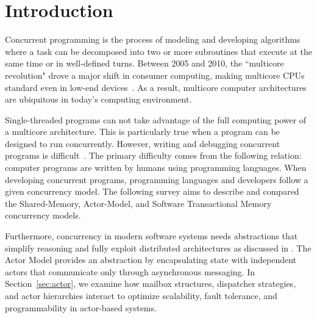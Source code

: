 \section{Introduction\label{sec:introduction}}
Concurrent programming is the process of modeling and
developing algorithms where a task can be decomposed into
two or more subroutines that execute at the same time or in well-defined turns.
Between 2005 and 2010, the ``multicore revolution" drove a major shift in consumer computing,
making multicore CPUs standard even in low-end devices~\cite{alseqyani2023history}.
As a result, multicore computer architectures are ubiquitous in today’s computing environment.

Single-threaded programs can not take advantage of the full computing power of a multicore architecture.
This is particularly true when a program can be designed to run concurrently.
However, writing and debugging concurrent programs is difficult~\cite{huang2016debuggingConcurrentPrograms}.
The primary difficulty comes from the following relation: computer programs
are written by humans using programming languages. 
When developing concurrent programs, programming languages and developers
follow a given concurrency model. The following survey aims to describe
and compared the Shared-Memory, Actor-Model, and Software Transactional Memory
concurrency models.

Furthermore, concurrency in modern software systems needs abstractions
that simplify reasoning and fully exploit distributed
architectures as discussed in \cite{10.1145/357980.358021}.
The Actor Model provides an abstraction by encapsulating state
with independent actors that communicate only through
asynchronous messaging. In Section~\ref{sec:actor},
we examine how mailbox structures, dispatcher strategies,
and actor hierarchies interact to optimize scalability, fault tolerance,
and programmability in actor-based systems.
